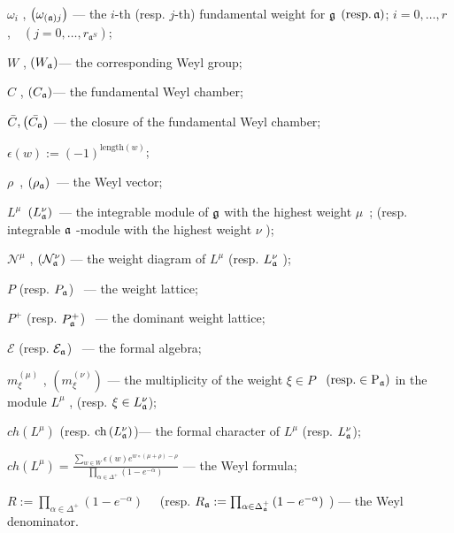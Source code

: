 \documentclass[12pt]{article}
\begin{document}
$\omega _{i}$ , $\left( \omega _{\left( \frak{a}\right) j}\right) $ --- the $%
i$-th (resp. $j$-th) fundamental weight for $\frak{g}$ $\left( \mathrm{{resp. \,}\frak{%
a}}\right) $; $i=0,\ldots ,r$,\ \ $\left( j=0,\ldots ,r_{\mathfrak{a}%
^S}\right) $;

$W$ , $\left( W_{\frak{a}}\right) $--- the corresponding Weyl group;

$C$ , $\left( C_{\frak{a}}\right) $--- the fundamental Weyl chamber;

$\bar{C}, \left(\bar{C_{\frak{a}}}\right)$ --- the closure of the
fundamental Weyl chamber;

$\epsilon \left( w\right) :=\left( -1\right) ^{\mathrm{length}(w)}$;

$\rho $\ , $\left( \rho _{\frak{a}}\right) $\ --- the Weyl vector;

$L^{\mu }$\ $\left( L_{\frak{a}}^{\nu }\right) $\ --- the integrable module
of $\frak{g}$ with the highest weight $\mu $\ ; (resp. integrable $\frak{a}$
-module with the highest weight $\nu $ );

$\mathcal{N}^{\mu }$ , $\left( \mathcal{N}_{\frak{a}}^{\nu }\right) $ ---
the weight diagram of $L^{\mu }$ (resp. ${}L_{\frak{a}}^{\nu }$ );

$P$ (resp. $P_{\frak{a}} $) \ --- the weight lattice;

$P^{+}$ (resp. $P_{\frak{a}}^{+} $) \ --- the dominant weight lattice;

$\mathcal{E}$ (resp. $\mathcal{E}_{\frak{a}} $) \ --- the formal algebra;

$m_{\xi }^{\left( \mu \right) }$ , $\left( m_{\xi }^{\left( \nu \right)
}\right) $ --- the multiplicity of the weight $\xi \in P$ \ $\left( \mathrm{{%
resp. }\in P_{\frak{a}}}\right) $ in the module $L^{\mu }$ , (resp. $\xi \in
L_{\frak{a}}^{\nu } $);

$ch\left( L^{\mu }\right) $ (resp. $\mathrm{ch}\left( L_{\frak{a}}^{\nu
}\right) $)--- the formal character of $L^{\mu }$ (resp. $L_{\frak{a}}^{\nu
} $);

$ch\left( L^{\mu }\right)  =\frac{\sum_{w\in W}\epsilon (w)e^{w\circ (\mu
+\rho )-\rho }} {\prod_{\alpha \in \Delta ^{+}} \left( 1-e^{-\alpha }\right)
} $ --- the Weyl formula;

$R:=\prod_{\alpha \in \Delta ^{+}}\left( 1-e^{-\alpha }\right) \quad $
(resp. $R_{\frak{a}}: =\prod_{\alpha \in \Delta_{\frak{a}}^{+}} \left(
1-e^{-\alpha }\right) $ ) --- the Weyl denominator.
\end{document}
